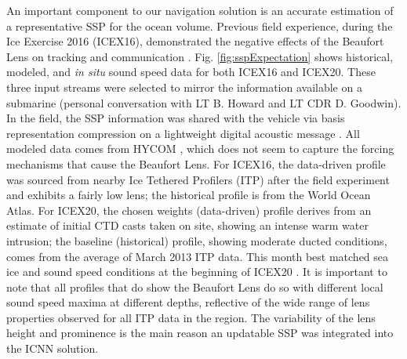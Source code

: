 An important component to our navigation solution is an accurate estimation of a representative SSP for the ocean volume.
Previous field experience, during the Ice Exercise 2016 (ICEX16), demonstrated the negative effects of the Beaufort Lens on tracking and communication \citep{schmidt_acoustic_2016}.
Fig. \ref{fig:sspExpectation} shows historical, modeled, and \textit{in situ} sound speed data for both ICEX16 and ICEX20.
These three input streams were selected to mirror the information available on a submarine (personal conversation with LT B. Howard and LT CDR D. Goodwin). 
In the field, the SSP information was shared with the vehicle via basis representation compression on a lightweight digital acoustic message \citep{bhatt_embedded_2022}. 
All modeled data comes from HYCOM \cite{chassignet_hycom_2007}, which does not seem to capture the forcing mechanisms that cause the Beaufort Lens.
For ICEX16, the data-driven profile was sourced from nearby Ice Tethered Profilers (ITP) after the field experiment \cite{Krishfield2008,toole_ice-tethered_2011} and exhibits a fairly low lens; the historical profile is from the World Ocean Atlas.
For ICEX20, the chosen weights (data-driven) profile derives from an estimate of initial CTD casts taken on site, showing an intense warm water intrusion; the baseline (historical) profile, showing moderate ducted conditions, comes from the average of March 2013 ITP data.
This month best matched sea ice and sound speed conditions at the beginning of ICEX20 \citep{bhatt_embedded_2022}.
It is important to note that all profiles that do show the Beaufort Lens do so with different local sound speed maxima at different depths, reflective of the wide range of lens properties observed for all ITP data in the region. 
The variability of the lens height and prominence is the main reason an updatable SSP was integrated into the ICNN solution.

